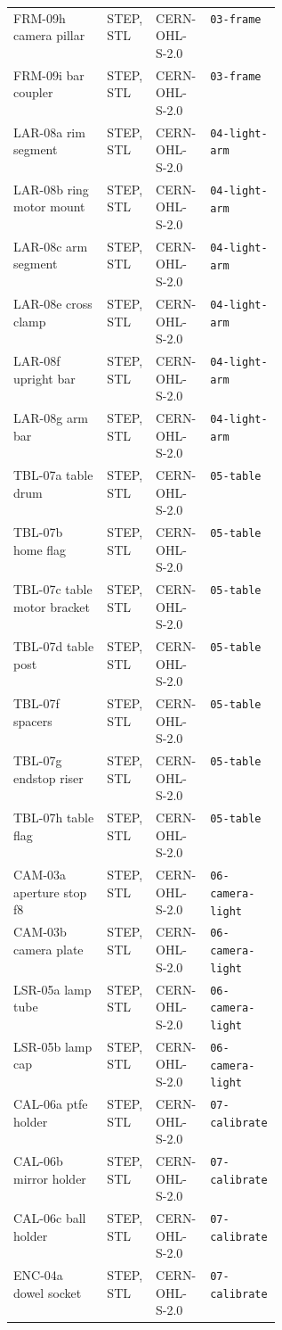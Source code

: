 \begin{tabular}{p{0.35\linewidth}lll}
FRM-09h camera pillar & STEP, STL & CERN-OHL-S-2.0 & \texttt{03-frame} \\
FRM-09i bar coupler & STEP, STL & CERN-OHL-S-2.0 & \texttt{03-frame} \\
LAR-08a rim segment & STEP, STL & CERN-OHL-S-2.0 & \texttt{04-light-arm} \\
LAR-08b ring motor mount & STEP, STL & CERN-OHL-S-2.0 & \texttt{04-light-arm} \\
LAR-08c arm segment & STEP, STL & CERN-OHL-S-2.0 & \texttt{04-light-arm} \\
LAR-08e cross clamp & STEP, STL & CERN-OHL-S-2.0 & \texttt{04-light-arm} \\
LAR-08f upright bar & STEP, STL & CERN-OHL-S-2.0 & \texttt{04-light-arm} \\
LAR-08g arm bar & STEP, STL & CERN-OHL-S-2.0 & \texttt{04-light-arm} \\
TBL-07a table drum & STEP, STL & CERN-OHL-S-2.0 & \texttt{05-table} \\
TBL-07b home flag & STEP, STL & CERN-OHL-S-2.0 & \texttt{05-table} \\
TBL-07c table motor bracket & STEP, STL & CERN-OHL-S-2.0 & \texttt{05-table} \\
TBL-07d table post & STEP, STL & CERN-OHL-S-2.0 & \texttt{05-table} \\
TBL-07f spacers & STEP, STL & CERN-OHL-S-2.0 & \texttt{05-table} \\
TBL-07g endstop riser & STEP, STL & CERN-OHL-S-2.0 & \texttt{05-table} \\
TBL-07h table flag & STEP, STL & CERN-OHL-S-2.0 & \texttt{05-table} \\
CAM-03a aperture stop f8 & STEP, STL & CERN-OHL-S-2.0 & \texttt{06-camera-light} \\
CAM-03b camera plate & STEP, STL & CERN-OHL-S-2.0 & \texttt{06-camera-light} \\
LSR-05a lamp tube & STEP, STL & CERN-OHL-S-2.0 & \texttt{06-camera-light} \\
LSR-05b lamp cap & STEP, STL & CERN-OHL-S-2.0 & \texttt{06-camera-light} \\
CAL-06a ptfe holder & STEP, STL & CERN-OHL-S-2.0 & \texttt{07-calibrate} \\
CAL-06b mirror holder & STEP, STL & CERN-OHL-S-2.0 & \texttt{07-calibrate} \\
CAL-06c ball holder & STEP, STL & CERN-OHL-S-2.0 & \texttt{07-calibrate} \\
ENC-04a dowel socket & STEP, STL & CERN-OHL-S-2.0 & \texttt{07-calibrate} \\

\end{tabular}
